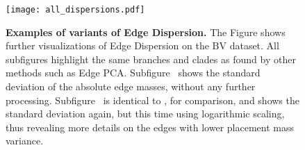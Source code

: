 
\begin{figure}[!htpb]
    \centering
    \texttt{[image: all\_dispersions.pdf]}
    \begin{subfigure}{0pt}
        \label{fig:all_dispersions:sub:em_var}
    \end{subfigure}
    \begin{subfigure}{0pt}
        \label{fig:all_dispersions:sub:em_varc}
    \end{subfigure}
    \begin{subfigure}{0pt}
        \label{fig:all_dispersions:sub:em_iod}
    \end{subfigure}
    \begin{subfigure}{0pt}
        \label{fig:all_dispersions:sub:ei_var}
    \end{subfigure}
    \caption[Examples of variants of Edge Dispersion]{
        \textbf{Examples of variants of Edge Dispersion.}
        The Figure shows further visualizations of Edge Dispersion on the \ac{BV} dataset.
        All subfigures highlight the same branches and clades as found by other methods such as Edge PCA.
        Subfigure~
        shows the standard deviation of the absolute edge masses, without any further processing.
        Subfigure~
        is identical to , for comparison,
        and shows the standard deviation again, but this time using logarithmic scaling,
        thus revealing more details on the edges with lower placement mass variance.
}
\end{figure}
